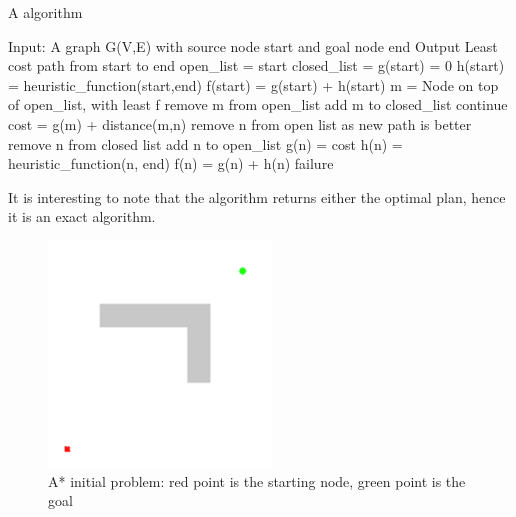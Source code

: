 \begin{algorithm}
\caption{A algorithm}\label{alg:a_star}
\begin{algorithmic}
\STATE Input: A graph G(V,E) with source node start and goal node end
\STATE Output Least cost path from start to end
\STATE open\_list = {start}
\STATE closed\_list = {}
\STATE g(start) = 0
\STATE h(start) = heuristic\_function(start,end)
\STATE f(start) = g(start) + h(start)
    \STATE m = Node on top of open\_list, with least f
        \RETURN
    \ENDIF
    \STATE remove m from open\_list
    \STATE add m to closed\_list
    \STATE continue
    \ENDIF
    \STATE cost = g(m) + distance(m,n)
    \STATE remove n from open list as new path is better
    \ENDIF
    \STATE remove n from closed list
    \ENDIF
    \STATE add n to open\_list
    \STATE g(n) = cost
    \STATE h(n) = heuristic\_function(n, end)
    \STATE f(n) = g(n) + h(n)
    \ENDIF
    \ENDFOR
    \ENDWHILE
\RETURN failure
\end{algorithmic}
\end{algorithm}
It is interesting to note that the algorithm returns either the optimal plan, hence it is an exact algorithm.
\begin{figure}[H]
    \centering
    \includegraphics[scale=0.60]{Images/Chapter 4/Aproblem.png}
    \caption{A* initial problem: red point is the starting node, green point is the goal}
    \label{fig:aproblem}
\end{figure}

